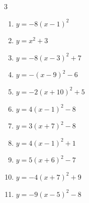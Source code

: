 \begin{multicols}{3}
\begin{enumerate}
\columnbreak %

  \item $\displaystyle y=-8\left( x-1\right)^{2}$

        \phantom{$\displaystyle 頂点\left( 1 , 0 \right)$}

  \item $\displaystyle y=x^{2}+3$

        \phantom{$\displaystyle 頂点\left( 0 , 3 \right)$}

  \item $\displaystyle y=-8\left( x-3\right)^{2}+7$

        \phantom{$\displaystyle 頂点\left( 3 , 7 \right)$}

  \item $\displaystyle y=-\left( x-9\right)^{2}-6$

        \phantom{$\displaystyle 頂点\left( 9 , -6 \right)$}

  \item $\displaystyle y=-2\left( x+10\right)^{2}+5$

        \phantom{$\displaystyle 頂点\left( -10 , 5 \right)$}

  \item $\displaystyle y=4\left( x-1\right)^{2}-8$

        \phantom{$\displaystyle 頂点\left( 1 , -8 \right)$}

  \item $\displaystyle y=3\left( x+7\right)^{2}-8$

        \phantom{$\displaystyle 頂点\left( -7 , -8 \right)$}

  \item $\displaystyle y=4\left( x-1\right)^{2}+1$

        \phantom{$\displaystyle 頂点\left( 1 , 1 \right)$}

  \item $\displaystyle y=5\left( x+6\right)^{2}-7$

        \phantom{$\displaystyle 頂点\left( -6 , -7 \right)$}

  \item $\displaystyle y=-4\left( x+7\right)^{2}+9$

        \phantom{$\displaystyle 頂点\left( -7 , 9 \right)$}

  \item $\displaystyle y=-9\left( x-5\right)^{2}-8$

        \phantom{$\displaystyle 頂点\left( 5 , -8 \right)$}


\end{enumerate}
\end{multicols}
